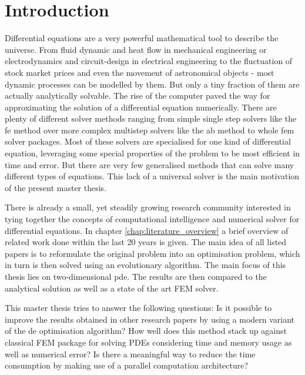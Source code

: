 \documentclass[./\jobname.tex]{subfiles}
\begin{document}
\section{Introduction}

Differential equations are a very powerful mathematical tool to describe the universe. From fluid dynamic and heat flow in mechanical engineering or electrodynamics and circuit-design in electrical engineering to the fluctuation of stock market prices and even the movement of astronomical objects - most dynamic processes can be modelled by them. But only a tiny fraction of them are actually analytically solvable. The rise of the computer paved the way for approximating the solution of a differential equation numerically. There are plenty of different solver methods ranging from simple single step solvers like the \gls{fe} method over more complex multistep solvers like the \gls{ab} method to whole \gls{fem} solver packages. Most of these solvers are specialised for one kind of differential equation, leveraging some special properties of the problem to be most efficient in time and error. But there are very few generalised methods that can solve many different types of equations. This lack of a universal solver is the main motivation of the present master thesis.

There is already a small, yet steadily growing research community interested in tying together the concepts of computational intelligence and numerical solver for differential equations. In chapter \ref{chap:literature_overview} a brief overview of related work done within the last 20 years is given. The main idea of all listed papers is to reformulate the original problem into an optimisation problem, which in turn is then solved using an evolutionary algorithm. The main focus of this thesis lies on two-dimensional \gls{pde}. The results are then compared to the analytical solution as well as a state of the art FEM solver.  

This master thesis tries to answer the following questions: 
Is it possible to improve the results obtained in other research papers by using a modern variant of the \gls{de} optimisation algorithm? How well does this method stack up against classical FEM package for solving PDEs considering time and memory usage as well as numerical error? Is there a meaningful way to reduce the time consumption by making use of a parallel computation architecture? 
\end{document}
